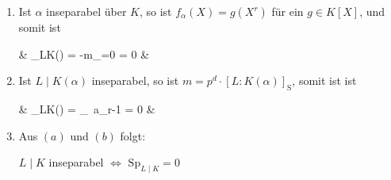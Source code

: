 \begin{remark}
	\begin{enumerate}[left=0pt,label={(\alph*)}]
		\item Ist $\alpha$ inseparabel über $K$, so ist $f_\alpha(X) = g(X^r)$ für ein $g\in K[X]$, und somit ist \begin{flalign*}
			\quad & _{L\mid K}(\alpha) = -m\cdot {}_{=0} = 0 &
		\end{flalign*}
		\item Ist $L\mid K(\alpha)$ inseparabel, so ist $m = p^d\cdot [L:K(\alpha)]_{\mathrm S}$, somit ist ist \begin{flalign*}
			\quad & _{L\mid K}(\alpha) = _{}\cdot\, a_{r-1} = 0 &
		\end{flalign*}
		\item Aus $(a)$ und $(b)$ folgt: \begin{adjustwidth}{2em}{0pt}
			$L\mid K$ inseparabel \hspace*{1em} $\Leftrightarrow$ \hspace*{1em} $\mathrm{Sp}_{L\mid K} = 0$
		\end{adjustwidth}
	\end{enumerate}
\end{remark}

